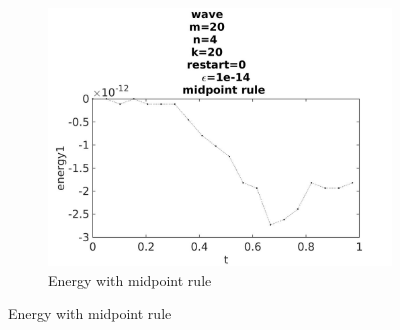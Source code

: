 \begin{figure}[H]
        \begin{subfigure}[b]{0.30\textwidth}
                \includegraphics[width=\textwidth]{../MATLAB/fig/energyovertimemidpoint.jpg}
                \caption{ Energy with midpoint rule }
                \label{fig:energyovertimemidpoint}
        \end{subfigure}
        

\end{figure}
